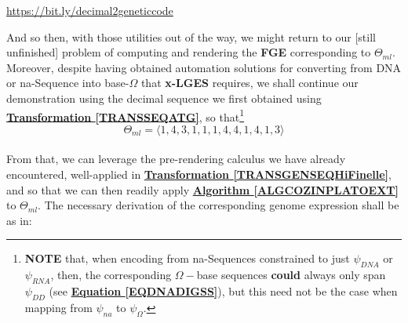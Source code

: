 \documentclass[a4paper, 18pt]{book} %
\begin{document}
 \url{https://bit.ly/decimal2geneticcode}

\vspace{1em}


And so then, with those utilities out of the way, we might return to our [still unfinished] problem of computing and rendering the \textbf{FGE} corresponding to $\Theta_{ml}$. Moreover, despite having obtained automation solutions for converting from DNA or na-Sequence into base-$\Omega$ that \textbf{x-LGES} requires, we shall continue our demonstration using the decimal sequence we first obtained using 
 \textbf{\hyperref[TRANSSEQATG]{Transformation \ref{TRANSSEQATG}}}, so that\footnote{\textbf{NOTE} that, when encoding from na-Sequences constrained to just $\psi_{DNA}$ or $\psi_{RNA}$, then, the corresponding $\Omega-$base sequences \textbf{could} always only span $\psi_{DD}$ (see \textbf{\hyperref[EQDNADIGSS]{Equation \ref{EQDNADIGSS}}}), but this need not be the case when mapping from $\psi_{na}$ to $\psi_{\Omega}$.}\\

\begin{equation}
\label{EQSEQMLLA}
\Theta_{ml} = \langle  1, 4, 3, 1, 1, 1, 4, 4, 1, 4, 1, 3 \rangle
\end{equation}\\

From that, we can leverage the pre-rendering calculus we have already encountered, well-applied in \textbf{\hyperref[TRANSGENSEQHiFinelle]{Transformation \ref{TRANSGENSEQHiFinelle}}}, and so that we can then readily apply \textbf{\hyperref[ALGCOZINPLATOEXT]{Algorithm \ref{ALGCOZINPLATOEXT}}} to $\Theta_{ml}$. The necessary derivation of the corresponding genome expression shall be as in: 
\end{document}
